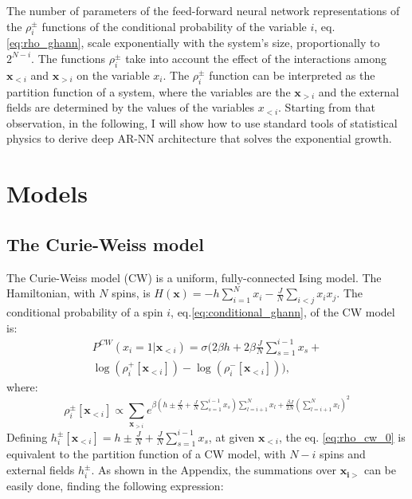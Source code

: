 \documentclass[aps,physrev,10pt,floatfix,reprint]{revtex4-2}
\begin{document}
The number of parameters of the feed-forward neural network representations of the $\rho_i^{\pm}$ functions of the conditional probability of the variable $i$, eq.\ref{eq:rho_ghann}, scale exponentially with the system's size, proportionally to $2^{N-i}$. 
The functions $\rho_i^{\pm}$ take into account the effect of the interactions among $\mathbf{x}_{<i}$ and $\mathbf{x}_{>i}$ on the variable $x_i$. 
The $\rho_i^{\pm}$ function can be interpreted as the partition function of a system, where the variables are the $\mathbf{x}_{>i}$ and the external fields are determined by the values of the variables $x_{<i}$.
Starting from that observation, in the following, I will show how to use standard tools of statistical physics to derive deep AR-NN architecture that solves the exponential growth.  \\

\section{Models}
\subsection{The Curie-Weiss model}

The Curie-Weiss model (CW) is a uniform, fully-connected Ising model. The Hamiltonian, with $N$ spins, is $H\left(\mathbf{x}\right)=-h\sum_{i=1}^{N}x_{i}-\frac{J}{N}\sum_{i<j}x_{i}x_{j}$. The conditional probability of a spin $i$, eq.\ref{eq:conditional_ghann}, of the CW model is:
\begin{multline}
P^{CW}\left(x_{i}=1|\mathbf{x}_{<i}\right) = 
\sigma\bigg( 
 2 \beta h + 2 \beta \frac{J}{N}\sum_{s=1}^{i-1}x_{s} + \\
 \log(\rho_i^+[\mathbf{x}_{<i}]) - \log(\rho_i^-[\mathbf{x}_{<i}])
\bigg),
\label{eq:conditional_cw}
\end{multline}
where:
\begin{equation}
\rho_i^{\pm}[\mathbf{x}_{<i}] \propto \sum_{\mathbf{x}_{>i}}e^{\beta \left(h\pm\frac{J}{N}+\frac{J}{N}\sum_{s=1}^{i-1}x_{s}\right)\sum_{l=i+1}^{N}x_{l}+\frac{\beta J}{2N}(\sum_{l=i+1}^{N}x_{l})^{2}} 
\label{eq:rho_cw_0}
\end{equation}
Defining $h_i^{\pm}[\mathbf{x}_{<i}] =h\pm\frac{J}{N}+\frac{J}{N}\sum_{s=1}^{i-1}x_{s}$, at given $\mathbf{x}_{<i}$, the eq. \ref{eq:rho_cw_0} is equivalent to the partition function of a CW model, with $N-i$ spins and external fields $h_i^{\pm}$. 
As shown in the Appendix, the summations over $\mathbf{x_{i>}}$ can be easily done, finding the following expression:
\end{document}

